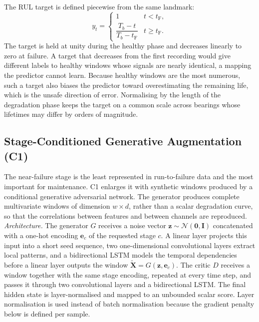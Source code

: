 \documentclass[review]{elsarticle}
\begin{document}
The RUL target is defined piecewise from the same landmark:
\begin{equation}
  y_t =
  \begin{cases}
    1 & t < t_{\mathrm{F}},\\[2pt]
    \dfrac{T_b - t}{T_b - t_{\mathrm{F}}} & t \geq t_{\mathrm{F}}.
  \end{cases}
  \label{eq:rul_target}
\end{equation}
The target is held at unity during the healthy phase and decreases
linearly to zero at failure. A target that decreases from the first
recording would give different labels to healthy windows whose
signals are nearly identical, a mapping the predictor cannot learn.
Because healthy windows are the most numerous, such a target also
biases the predictor toward overestimating the remaining life, which
is the unsafe direction of error. Normalising by the length of the
degradation phase keeps the target on a common scale across bearings
whose lifetimes may differ by orders of magnitude.

\subsection{Stage-Conditioned Generative Augmentation (C1)}
\label{sec:c1_gan}

The near-failure stage is the least represented in run-to-failure data
and the most important for maintenance. C1 enlarges it with synthetic
windows produced by a conditional generative adversarial network. The
generator produces complete multivariate windows of dimension
$w \times d$, rather than a scalar degradation curve, so that the
correlations between features and between channels are reproduced.\\

\textit{Architecture.} The generator $G$ receives a noise vector
$\mathbf{z} \sim \mathcal{N}(\mathbf{0}, \mathbf{I})$ concatenated with
a one-hot encoding $\mathbf{e}_c$ of the requested stage $c$. A linear
layer projects this input into a short seed sequence, two
one-dimensional convolutional layers extract local patterns, and a
bidirectional LSTM models the temporal dependencies before a linear
layer outputs the window $\tilde{\mathbf{X}} = G(\mathbf{z},
\mathbf{e}_c)$. The critic $D$ receives a window together with the same
stage encoding, repeated at every time step, and passes it through two
convolutional layers and a bidirectional LSTM. The final hidden state
is layer-normalised and mapped to an unbounded scalar score. Layer
normalisation is used instead of batch normalisation because the
gradient penalty below is defined per sample.\\
\end{document}
